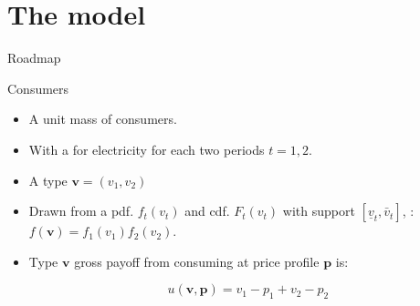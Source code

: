 \documentclass{class}
\begin{document}
\section{The model}

\begin{frame}{Roadmap}
  \tableofcontents [sectionstyle=show/shaded,subsectionstyle=show/shaded]
\end{frame}




\begin{frame}{Consumers}

\begin{itemize}
    \item A unit mass of consumers.

\vfill

    \item With a  for electricity for each two periods $t = 1,2$.

\vfill

    \item A  type $\textbf{v}=(v_1,v_2) $
    
\vfill

\item Drawn from a pdf. $f_t(v_t)$ and cdf. $F_t(v_t)$ with support $[\underline{v}_t,\bar{v}_t]$, : $f(\textbf{v}) = f_1(v_1)f_2(v_2)$.
            





\vfill

\item Type $\textbf{v}$ gross payoff from consuming at price profile $\textbf{p}$ is:

\begin{equation*}
 u\left(\textbf{v},\textbf{p}\right)= v_1-p_1 +  v_2-p_2
 \end{equation*}
\end{itemize}    
\end{frame}
\end{document}
